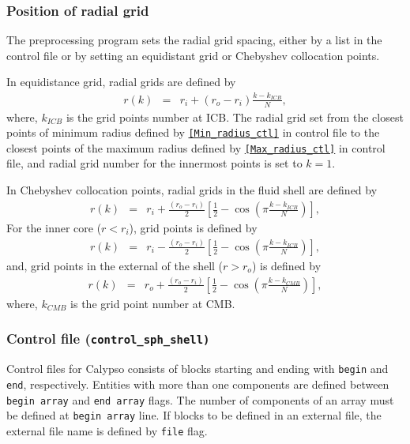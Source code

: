 \subsubsection{Position of radial grid}
The preprocessing program sets the radial grid spacing, either by a list in the control file or by setting an equidistant grid or Chebyshev collocation points.

In equidistance grid, radial grids are defined by
%
\begin{eqnarray}
r(k) & = & r_{i} + \left(r_{o}-r_{i} \right) \frac{k-k_{ICB}}{N},
\nonumber
\end{eqnarray}
%
where, $k_{ICB}$ is the grid points number at ICB. The radial grid set from the closest points of minimum radius defined by \hyperref[href_i:Min_radius_ctl]{\tt [Min\_radius\_ctl]} in control file to the closest points of the maximum radius defined by \hyperref[href_i:Max_radius_ctl]{\tt [Max\_radius\_ctl]} in control file, and radial grid number for the innermost points is set to $k = 1$.

In Chebyshev collocation points, radial grids in the fluid shell are defined by
%
\begin{eqnarray}
r(k) & = & r_{i} + \frac{\left(r_{o}-r_{i} \right)}{2} \left[ \frac{1}{2} - \cos \left(\pi \frac{ k-k_{ICB}}{N} \right) \right],
\nonumber
\end{eqnarray}
%
For the inner core ($r<r_{i}$), grid points is defined by
%
\begin{eqnarray}
r(k) & = & r_{i} - \frac{\left(r_{o}-r_{i} \right)}{2} \left[ \frac{1}{2} - \cos \left(\pi \frac{ k-k_{ICB}}{N} \right) \right],
\nonumber
\end{eqnarray}
%
and, grid points in the external of the shell ($r>r_{o}$) is defined by
%
\begin{eqnarray}
r(k) & = & r_{o} + \frac{\left(r_{o}-r_{i} \right)}{2} \left[ \frac{1}{2} - \cos \left(\pi \frac{ k-k_{CMB}}{N} \right) \right],
\nonumber
\end{eqnarray}
%
where, $k_{CMB}$ is the grid point number at CMB.

\subsubsection{Control file (\tt{control\_sph\_shell})}
Control files for Calypso consists of blocks starting and ending with \verb|begin| and \verb|end|, respectively. Entities with more than one components are defined between \verb|begin array| and \verb|end array| flags. The number of components of an array must be defined at \verb|begin array| line. If blocks to be defined in an external file, the external file name is defined by \verb|file| flag. 

